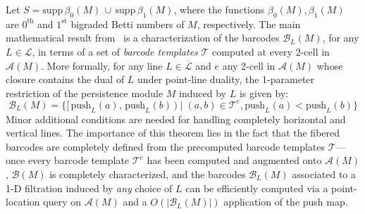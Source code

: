 \documentclass{article} %
\begin{document}
Let $S = \mathrm{supp}\,\beta_0(M) \, \cup \, \mathrm{supp}\,\beta_1(M)$, where the functions $\beta_0(M), \beta_1(M)$ are $0^{\text{th}}$ and $1^{\text{st}}$ bigraded Betti numbers of $M$, respectively. 
The main mathematical result from~\cite{lesnick2015interactive} is a characterization of the barcodes $\mathcal{B}_L(M)$, for any $L \in \mathcal{L}$, in terms of a set of \emph{barcode templates} $\mathcal{T}$ computed at every 2-cell in $\mathcal{A}(M)$.
 More formally, for any line $L \in \overline{\mathcal{L}}$ and $e$ any 2-cell in $\mathcal{A}(M)$ whose closure contains the dual of $L$ under point-line duality, the 1-parameter restriction of the persistence module $M$ induced by $L$ is given by: 
 \begin{equation}
 \mathcal{B}_L(M) = \{ [\,\mathrm{push}_L(a), \, \mathrm{push}_L(b)\,) \mid (a,b) \in \mathcal{T}^e, \mathrm{push}_L(a) < \mathrm{push}_L(b)  \} 
\end{equation}
Minor additional conditions are needed for handling completely horizontal and vertical lines. 
The importance of this theorem lies in the fact that the fibered barcodes are completely defined from the precomputed barcode templates $\mathcal{T}$---once every barcode template $\mathcal{T}^e$ has been computed and augmented onto $\mathcal{A}(M)$, $\mathcal{B}(M)$ is completely characterized, and the barcodes $\mathcal{B}_L(M)$ associated to a 1-D filtration induced by \emph{any} choice of $L$ can be efficiently computed via a point-location query on $\mathcal{A}(M)$ and a $O(\lvert \mathcal{B}_L(M) \rvert)$ application of the push map.

 

\end{document}
